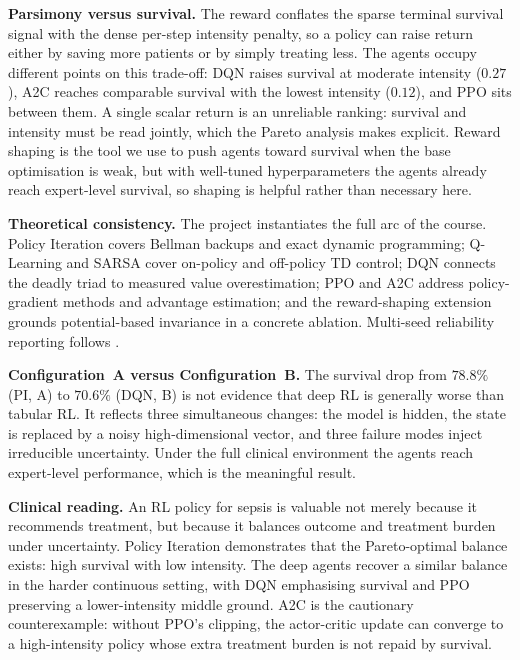 \documentclass[11pt,a4paper]{article}
\begin{document}
\textbf{Parsimony versus survival.}
The reward conflates the sparse terminal survival signal with the dense per-step
intensity penalty, so a policy can raise return either by saving more patients or
by simply treating less. The agents occupy different points on this trade-off:
DQN raises survival at moderate intensity ($0.27$), A2C reaches comparable survival
with the lowest intensity ($0.12$), and PPO sits between them. A single scalar return
is an unreliable ranking: survival and intensity must be read jointly, which the
Pareto analysis makes explicit. Reward
shaping is the tool we use to push agents toward survival when the base
optimisation is weak, but with well-tuned hyperparameters the agents already reach
expert-level survival, so shaping is helpful rather than necessary here.

\textbf{Theoretical consistency.}
The project instantiates the full arc of the course. Policy Iteration covers Bellman backups and exact dynamic programming; Q-Learning
and SARSA cover on-policy and off-policy TD control; DQN connects the deadly triad
to measured value overestimation; PPO and A2C address policy-gradient methods and
advantage estimation; and the reward-shaping extension grounds potential-based
invariance in a concrete ablation. Multi-seed reliability reporting follows
\cite{henderson2018}.

\textbf{Configuration~A versus Configuration~B.}
The survival drop from $78.8\%$ (PI, A) to $70.6\%$ (DQN, B) is not evidence that
deep RL is generally worse than tabular RL. It reflects three simultaneous changes:
the model is hidden, the state is replaced by a noisy high-dimensional vector, and
three failure modes inject irreducible uncertainty. Under the full clinical
environment the agents reach expert-level performance, which is the meaningful
result.

\textbf{Clinical reading.}
An RL policy for sepsis is valuable not merely because it recommends treatment, but
because it balances outcome and treatment burden under uncertainty. Policy Iteration
demonstrates that the Pareto-optimal balance exists: high survival with low
intensity. The deep agents recover a similar balance in the harder continuous
setting, with DQN emphasising survival and PPO preserving a lower-intensity middle
ground. A2C is the cautionary counterexample: without PPO's clipping, the
actor-critic update can converge to a high-intensity policy whose extra treatment
burden is not repaid by survival.


\end{document}
